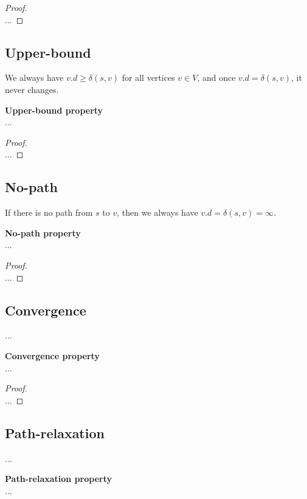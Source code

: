 \begin{proof} \textnormal{\cite[p.~?, thm. 24.10]{clrs}} \\
	...
\end{proof}

\subsection{Upper-bound}
We always have $v.d \geq \delta(s, v)$ for all vertices $v \in V$, and once
$v.d = \delta(s, v)$, it never changes.
\begin{lemma}
	\textbf{Upper-bound property} \\
	...
\end{lemma}

\begin{proof} \textnormal{\cite[p.~?, thm. 24.11]{clrs}} \\
	...
\end{proof}

\subsection{No-path}
If there is no path from $s$ to $v$, then we always have $v.d = \delta(s, v) =
\infty$.
\begin{corollary}
	\textbf{No-path property} \\
	...
\end{corollary}

\begin{proof} \textnormal{\cite[p.~?, thm. 24.12]{clrs}} \\
	...
\end{proof}

\subsection{Convergence}
...
\begin{lemma}
	\textbf{Convergence property} \\
	...
\end{lemma}

\begin{proof} \textnormal{\cite[p.~?, thm. 24.14]{clrs}} \\
	...
\end{proof}

\subsection{Path-relaxation}
...
\begin{lemma}
	\textbf{Path-relaxation property} \\
	...
\end{lemma}

